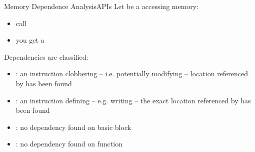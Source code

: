 \begin{frame}{Memory Dependence Analysis}{APIs}
Let  be a  accessing memory:

\begin{itemize}
\item call 
\item you get a 
\end{itemize}

\vfill
Dependencies are classified:

\begin{itemize}
\item {}: an instruction clobbering --
      i.e. potentially modifying -- location referenced by 
      has been found
\item {}: an instruction defining -- e.g.
      writing -- the exact location referenced by  has been
      found
\item {}: no dependency found on
       basic block
\item {}: no dependency found on
       function
\end{itemize}
\end{frame}

